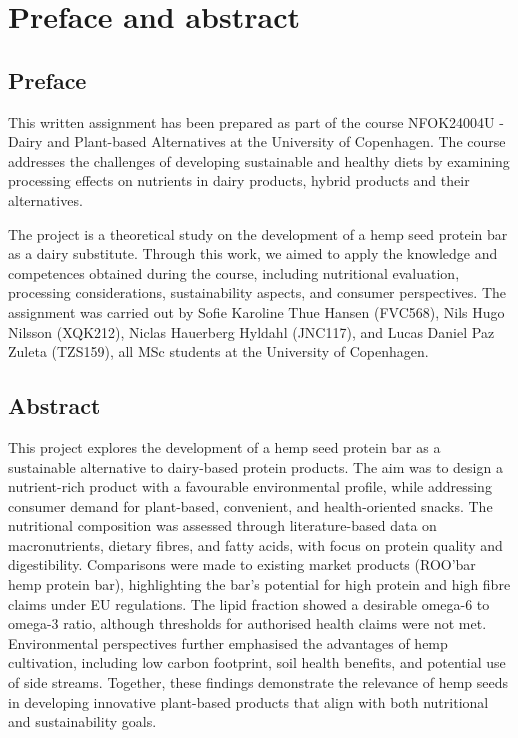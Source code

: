 \chapter*{Preface and abstract}
\setlength{\headheight}{12.71342pt}
\addtolength{\topmargin}{-0.71342pt}


\section*{Preface}
This written assignment has been prepared as part of the course NFOK24004U - Dairy and Plant-based Alternatives at the University of Copenhagen. The course addresses the challenges of developing sustainable and healthy diets by examining processing effects on nutrients in dairy products, hybrid products and their alternatives. 

\vspace{1em}
The project is a theoretical study on the development of a hemp seed protein bar as a dairy substitute. Through this work, we aimed to apply the knowledge and competences obtained during the course, including nutritional evaluation, processing considerations, sustainability aspects, and consumer perspectives. The assignment was carried out by Sofie Karoline Thue Hansen (FVC568), Nils Hugo Nilsson (XQK212), Niclas Hauerberg Hyldahl (JNC117), and Lucas Daniel Paz Zuleta (TZS159), all MSc students at the University of Copenhagen.

\section*{Abstract}
This project explores the development of a hemp seed protein bar as a sustainable alternative to dairy-based protein products. The aim was to design a nutrient-rich product with a favourable environmental profile, while addressing consumer demand for plant-based, convenient, and health-oriented snacks. The nutritional composition was assessed through literature-based data on macronutrients, dietary fibres, and fatty acids, with focus on protein quality and digestibility. Comparisons were made to existing market products (ROO'bar hemp protein bar), highlighting the bar's potential for high protein and high fibre claims under EU regulations. The lipid fraction showed a desirable omega-6 to omega-3 ratio, although thresholds for authorised health claims were not met. Environmental perspectives further emphasised the advantages of hemp cultivation, including low carbon footprint, soil health benefits, and potential use of side streams. Together, these findings demonstrate the relevance of hemp seeds in developing innovative plant-based products that align with both nutritional and sustainability goals.

\newpage

